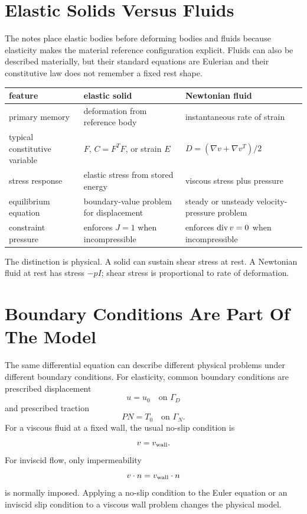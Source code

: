 \section{Elastic Solids Versus Fluids}
\label{sec:elastic-versus-fluid-caveats}

The notes place elastic bodies before deforming bodies and fluids because
elasticity makes the material reference configuration explicit.  Fluids can
also be described materially, but their standard equations are Eulerian and
their constitutive law does not remember a fixed rest shape.

\begin{center}
\begin{tabular}{p{} p{} p{}}
\hline
feature & elastic solid & Newtonian fluid\\
\hline
primary memory & deformation from reference body & instantaneous rate of
strain\\
typical constitutive variable & \(F\), \(C=F^TF\), or strain \(E\) &
\(D=(\nabla v+\nabla v^T)/2\)\\
stress response & elastic stress from stored energy & viscous stress plus
pressure\\
equilibrium equation & boundary-value problem for displacement & steady or
unsteady velocity-pressure problem\\
constraint pressure & enforces \(J=1\) when incompressible & enforces
\(\operatorname{div} v=0\) when incompressible\\
\hline
\end{tabular}
\end{center}

The distinction is physical.  A solid can sustain shear stress at rest.  A
Newtonian fluid at rest has stress \(-pI\); shear stress is proportional to
rate of deformation.

\section{Boundary Conditions Are Part Of The Model}
\label{sec:continuum-boundary-conditions}

The same differential equation can describe different physical problems under
different boundary conditions.  For elasticity, common boundary conditions are
prescribed displacement
\[
        u=u_0\quad \text{on }\Gamma_D
\]
and prescribed traction
\[
        P N=T_0\quad \text{on }\Gamma_N .
\]
For a viscous fluid at a fixed wall, the usual no-slip condition is
\[
        v=v_{\rm wall}.
\]
For inviscid flow, only impermeability
\[
        v\cdot n=v_{\rm wall}\cdot n
\]
is normally imposed.  Applying a no-slip condition to the Euler equation or an
inviscid slip condition to a viscous wall problem changes the physical model.

